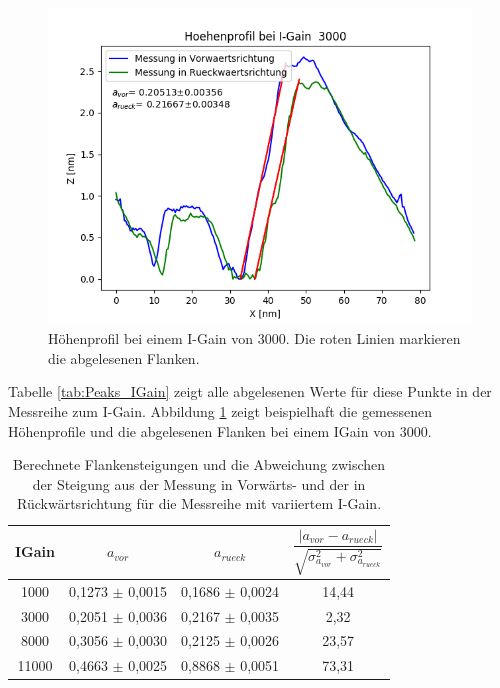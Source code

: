 \documentclass[12pt,a4paper]{article}
\begin{document}
\begin{figure}
\centering
\includegraphics[scale=0.8]{Bilder/Anhang/IGain/Profil_IGain_3000.png}
\caption{Höhenprofil bei einem I-Gain von 3000. Die roten Linien markieren die abgelesenen Flanken.}
\label{fig:Gold_IGain_Flankensteigung}
\end{figure}

Tabelle \ref{tab:Peaks_IGain} zeigt alle abgelesenen Werte für diese Punkte in der Messreihe zum I-Gain. Abbildung \ref{fig:Gold_IGain_Flankensteigung} zeigt beispielhaft die gemessenen Höhenprofile und die abgelesenen Flanken bei einem IGain von 3000. 

\begin{table}
\centering
\begin{tabular}{|c|c|c|c|}
\hline 
IGain & $a_{vor}$ & $a_{rueck}$ & $\dfrac{|a_{vor} - a_{rueck}|}{\sqrt{\sigma _{a_{vor}}^2 + \sigma _{a_{rueck}}^2}}$ \\ 
\hline 
1000 & 0,1273 $\pm$ 0,0015 & 0,1686 $\pm$ 0,0024 & 14,44 \\
\hline 
3000 & 0,2051 $\pm$ 0,0036 & 0,2167 $\pm$ 0,0035 & 2,32 \\ 
\hline 
8000 & 0,3056 $\pm$ 0,0030 & 0,2125 $\pm$ 0,0026 & 23,57 \\
\hline 
11000 & 0,4663 $\pm$ 0,0025 & 0,8868 $\pm$ 0,0051 & 73,31 \\
\hline 
\end{tabular} 
\caption{Berechnete Flankensteigungen und die Abweichung zwischen der Steigung aus der Messung in Vorwärts- und der in Rückwärtsrichtung für die Messreihe mit variiertem I-Gain.}
\label{tab:Steigungen_IGain}
\end{table}
\end{document}
